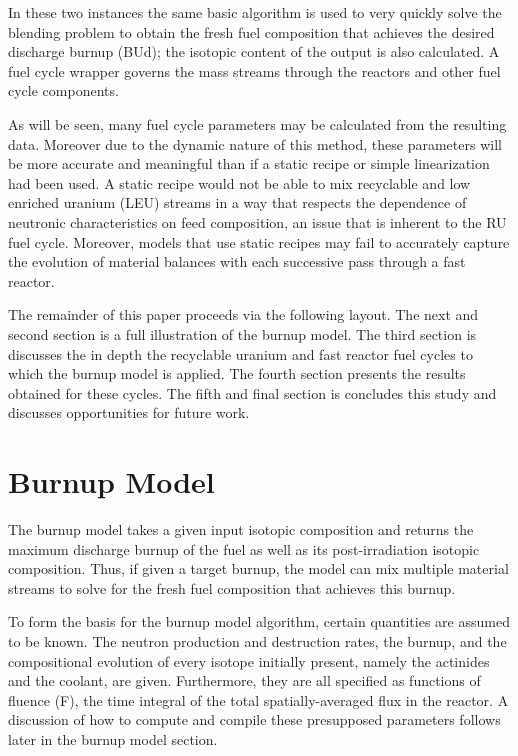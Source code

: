 In these two instances the same basic algorithm is used to very quickly solve the blending problem 
to obtain the fresh fuel composition that achieves the desired discharge burnup (BUd); the isotopic 
content of the output is also calculated.   A fuel cycle wrapper governs the mass streams through 
the reactors and other fuel cycle components.  

As will be seen, many fuel cycle parameters may be calculated from the resulting data.  Moreover 
due to the dynamic nature of this method, these parameters will be more accurate and meaningful 
than if a static recipe or simple linearization had been used.  A static recipe would not be able 
to mix recyclable and low enriched uranium (LEU) streams in a way that respects the dependence of 
neutronic characteristics on feed composition, an issue that is inherent to the RU fuel cycle.  
Moreover, models that use static recipes may fail to accurately capture the evolution of material 
balances with each successive pass through a fast reactor.   

The remainder of this paper proceeds via the following layout. The next and second section is a 
full illustration of the burnup model.  The third section is discusses the in depth the recyclable 
uranium and fast reactor fuel cycles to which the burnup model is applied.  The fourth section 
presents the results obtained for these cycles.  The fifth and final section is concludes this 
study and discusses opportunities for future work. 




\section{Burnup Model}
\label{1g_sec:bu_model}
The burnup model takes a given input isotopic composition and returns the maximum discharge 
burnup of the fuel as well as its post-irradiation isotopic composition.  Thus, if given a 
target burnup, the model can mix multiple material streams to solve for the fresh fuel composition 
that achieves this burnup.

To form the basis for the burnup model algorithm, certain quantities are assumed to be known.  
The neutron production and destruction rates, the burnup, and the compositional evolution of 
every isotope initially present, namely the actinides and the coolant, are given.  Furthermore, 
they are all specified as functions of fluence (F), the time integral of the total spatially-averaged 
flux in the reactor. A discussion of how to compute and compile these presupposed parameters follows 
later in the burnup model section. 


